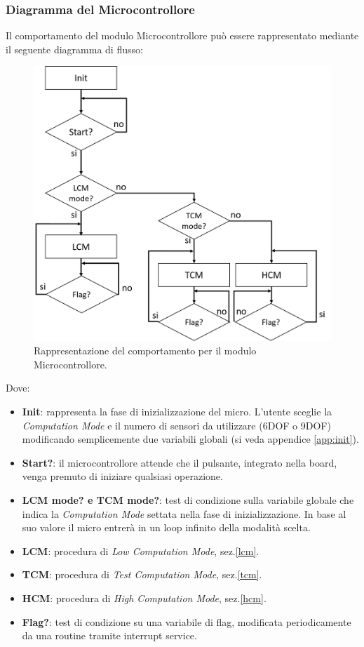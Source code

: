 \subsubsection{Diagramma del Microcontrollore}
Il comportamento del modulo Microcontrollore può essere rappresentato mediante il seguente diagramma di flusso:
\begin{figure}[H]  
	\centering 
	\includegraphics[scale=0.3]{implementazione/diagramma.png}
	\caption{Rappresentazione del comportamento per il modulo Microcontrollore.}
	\label{fig:diagrammaMicro}
\end{figure}
Dove:
\begin{itemize}
	\item \textbf{Init}: rappresenta la fase di inizializzazione del micro. L'utente sceglie la \textit{Computation Mode} e il numero di sensori da utilizzare (6DOF o 9DOF) modificando semplicemente due variabili globali (si veda appendice \ref{app:init}).
	\item \textbf{Start?}: il microcontrollore attende che il pulsante, integrato nella board, venga premuto di iniziare qualsiasi operazione.
	\item \textbf{LCM mode? e TCM mode?}: test di condizione sulla variabile globale che indica la \textit{Computation Mode} settata nella fase di inizializzazione. In base al suo valore il micro entrerà in un loop infinito della modalità scelta.
	\item \textbf{LCM}: procedura di \textit{Low Computation Mode}, sez.\ref{lcm}.
	\item \textbf{TCM}: procedura di \textit{Test Computation Mode}, sez.\ref{tcm}.
	\item \textbf{HCM}: procedura di \textit{High Computation Mode}, sez.\ref{hcm}.
	\item \textbf{Flag?}: test di condizione su una variabile di flag, modificata periodicamente da una routine tramite interrupt service.
\end{itemize}


